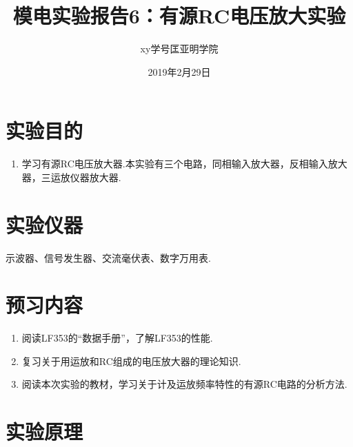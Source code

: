 \documentclass[a4paper]{article}
\title{模电实验报告6：有源RC电压放大实验}
\author{xy\quad 学号\quad 匡亚明学院}
\date{2019年2月29日}
\begin{document}
\maketitle


\section{实验目的}
\begin{enumerate}
\item 学习有源RC电压放大器.本实验有三个电路，同相输入放大器，反相输入放大器，三运放仪器放大器.
\end{enumerate}

\section{实验仪器}
示波器、信号发生器、交流毫伏表、数字万用表.

\section{预习内容}
\begin{enumerate}
\item 阅读LF353的“数据手册”，了解LF353的性能.
\item 复习关于用运放和RC组成的电压放大器的理论知识.
\item 阅读本次实验的教材，学习关于计及运放频率特性的有源RC电路的分析方法.
\end{enumerate}

\section{实验原理}
\end{document}
